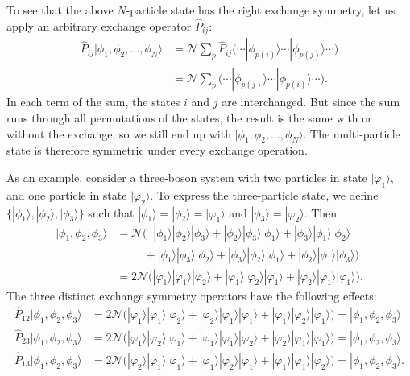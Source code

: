 \documentclass[pra,12pt]{revtex4}
\begin{document}
To see that the above $N$-particle state has the right exchange
symmetry, let us apply an arbitrary exchange operator $\hat{P}_{ij}$:
$$\begin{aligned}\hat{P}_{ij}|\phi_1,\phi_2,\dots,\phi_N\rangle &= \mathcal{N} \sum_p \hat{P}_{ij} \Big(\cdots  |\phi_{p(i)}\rangle  \cdots  |\phi_{p(j)}\rangle\cdots\Big) \\&= \mathcal{N} \sum_p \Big(\cdots  |\phi_{p(j)}\rangle  \cdots  |\phi_{p(i)}\rangle\cdots\Big).\end{aligned}$$
In each term of the sum, the states $i$ and $j$ are interchanged.  But
since the sum runs through all permutations of the states, the result
is the same with or without the exchange, so we still end up with
$|\phi_1,\phi_2,\dots,\phi_N\rangle$.  The multi-particle state is
therefore symmetric under every exchange operation.

As an example, consider a three-boson system with two particles in
state $|\varphi_1\rangle$, and one particle in state
$|\varphi_2\rangle$.  To express the three-particle state, we define
$\{|\phi_1\rangle, |\phi_2\rangle, |\phi_3\rangle\}$ such that
$|\phi_1\rangle = |\phi_2\rangle = |\varphi_1\rangle$ and
$|\phi_3\rangle = |\varphi_2\rangle$.  Then
$$\begin{aligned}|\phi_1,\phi_2,\phi_3\rangle &= \mathcal{N} \Big( \;\;
|\phi_1\rangle|\phi_2\rangle|\phi_3\rangle +
|\phi_2\rangle|\phi_3\rangle|\phi_1\rangle +
|\phi_3\rangle|\phi_1\rangle|\phi_2\rangle \\ &\qquad\;\, +
|\phi_1\rangle|\phi_3\rangle|\phi_2\rangle +
|\phi_3\rangle|\phi_2\rangle|\phi_1\rangle +
|\phi_2\rangle|\phi_1\rangle|\phi_3\rangle\Big) \\
&= 2\mathcal{N} \Big(
|\varphi_1\rangle|\varphi_1\rangle|\varphi_2\rangle +
|\varphi_1\rangle|\varphi_2\rangle|\varphi_1\rangle +
|\varphi_2\rangle|\varphi_1\rangle|\varphi_1\rangle\Big).
\end{aligned}$$
The three distinct exchange symmetry operators have the following effects:
$$\begin{aligned}\hat{P}_{12}|\phi_1,\phi_2,\phi_3\rangle &= 2\mathcal{N} \Big(
|\varphi_1\rangle|\varphi_1\rangle|\varphi_2\rangle +
|\varphi_2\rangle|\varphi_1\rangle|\varphi_1\rangle +
|\varphi_1\rangle|\varphi_2\rangle|\varphi_1\rangle\Big) = |\phi_1,\phi_2,\phi_3\rangle \\
\hat{P}_{23}|\phi_1,\phi_2,\phi_3\rangle &= 2\mathcal{N} \Big(
|\varphi_1\rangle|\varphi_2\rangle|\varphi_1\rangle +
|\varphi_1\rangle|\varphi_1\rangle|\varphi_2\rangle +
|\varphi_2\rangle|\varphi_1\rangle|\varphi_1\rangle\Big) = |\phi_1,\phi_2,\phi_3\rangle\\
\hat{P}_{13}|\phi_1,\phi_2,\phi_3\rangle &= 2\mathcal{N} \Big(
|\varphi_2\rangle|\varphi_1\rangle|\varphi_1\rangle +
|\varphi_1\rangle|\varphi_2\rangle|\varphi_1\rangle +
|\varphi_1\rangle|\varphi_1\rangle|\varphi_2\rangle\Big) = |\phi_1,\phi_2,\phi_3\rangle.
\end{aligned}$$
\end{document}
